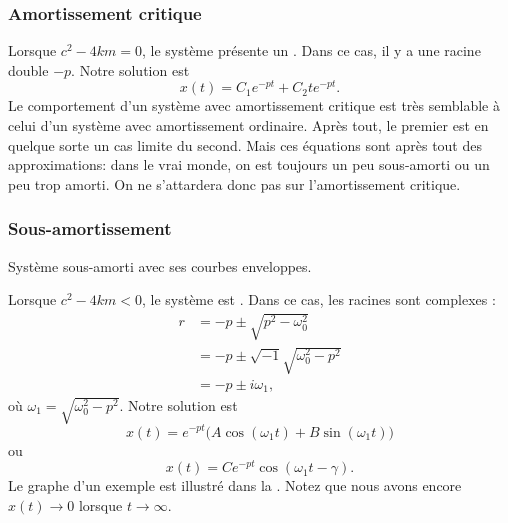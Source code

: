 \subsubsection{Amortissement critique}

Lorsque $c^2 - 4km = 0$, le système présente un \emph{}.  
Dans ce cas, il y a une racine double  $-p$.  Notre solution est 
\begin{equation*}
	x(t) = C_1 e^{-pt} + C_2 t e^{-pt} .
\end{equation*}
Le comportement d'un système avec amortissement critique est très semblable à celui d'un système avec amortissement ordinaire. Après tout, le premier est en quelque sorte un cas limite du second.  
Mais ces équations sont après tout des approximations: dans le vrai monde, 
on est toujours un peu sous-amorti ou un peu trop amorti. 
On ne s'attardera donc pas sur l'amortissement critique.

\subsubsection{Sous-amortissement}

\begin{mywrapfig}[13]{3.25in}
\capstart {}
\caption{Système sous-amorti avec ses courbes enveloppes.\label{mv:underdampedfig}}
\end{mywrapfig}
%
%
Lorsque $c^2 - 4km < 0$, le système est \emph{}. 
Dans ce cas, les racines sont complexes : 
\begin{align*}
	r & = -p \pm \sqrt{p^2 - \omega_0^2} \\
	  & = -p \pm \sqrt{-1}\sqrt{\omega_0^2 - p^2} \\
	  & = -p \pm i \omega_1 ,
\end{align*}
où $\omega_1 =\sqrt{\omega_0^2 - p^2}$.  Notre solution est
\begin{equation*}
	x(t) = e^{-pt} \bigl( A \cos (\omega_1 t) + B \sin (\omega_1 t) \bigr) 
\end{equation*}
ou
\begin{equation*}
	x(t) = C e^{-pt} \cos ( \omega_1 t - \gamma ) .
\end{equation*}
Le graphe d'un exemple est illustré dans la  .  
Notez que nous avons encore $x(t) \to 0$ lorsque $t \to \infty$.

